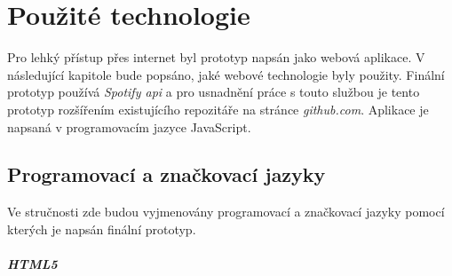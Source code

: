 \documentclass[thesis=B, czech]{FITthesis}[2019/03/06]
\begin{document}





\chapter{Použité technologie}

Pro lehký přístup přes internet byl prototyp napsán jako webová aplikace. V následující kapitole bude popsáno, jaké webové technologie byly použity. Finální prototyp používá \textit{Spotify \gls{api}} a pro usnadnění práce s touto službou je tento prototyp rozšířením existujícího repozitáře na stránce \textit{github.com}. Aplikace je napsaná v programovacím jazyce JavaScript.






\section{Programovací a značkovací jazyky}

Ve stručnosti zde budou vyjmenovány programovací a značkovací jazyky pomocí kterých je napsán finální prototyp.

\paragraph*{HTML5}
\end{document}
